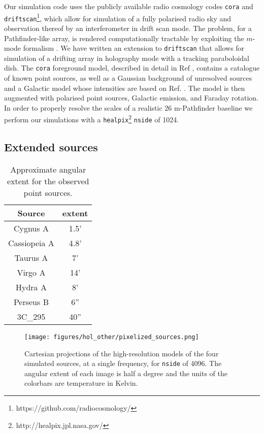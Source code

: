 Our simulation code uses the publicly available radio cosmology codes \texttt{cora} and \texttt{driftscan}\footnote{https://github.com/radiocosmology/}, which allow for simulation of a fully polarised radio sky and observation thereof by an interferometer in drift scan mode. The problem, for a Pathfinder-like array, is rendered computationally tractable by exploiting the $m$-mode formalism \citep{mmodes1, mmodes2}. We have written an extension to \texttt{driftscan} that allows for simulation of a drifting array in holography mode with a tracking paraboloidal dish. The \texttt{cora} foreground model, described in detail in Ref \citep{mmodes2}, contains a catalogue of known point sources, as well as a Gaussian background of unresolved sources and a Galactic model whose intensities are based on Ref. \citep{santoscoorayknox}. The model is then augmented with polarised point sources, Galactic emission, and Faraday rotation. In order to properly resolve the scales of a realistic 26 m-Pathfinder baseline we perform our simulations with a \texttt{healpix}\footnote{http://healpix.jpl.nasa.gov/} \citep{gorski} \texttt{nside} of 1024.


\subsection{Extended sources}

\begin{table}[ht]
\caption{Approximate angular extent for the observed point sources.} 
\label{tab2}
\begin{center}
\begin{tabular}{| c  | c |}
\hline
 Source  & extent  \\ \hline
Cygnus A & 1.5' \\ \hline
Cassiopeia A & 4.8' \\ \hline
Taurus A & 7' \\ \hline
Virgo A & 14' \\ \hline
Hydra A & 8' \\ \hline
Perseus B  & 6'' \\ \hline
3C\_295 & 40'' \\ \hline
\end{tabular}
\end{center}
\end{table}

\begin{figure}[h!]
\begin{center}
\texttt{[image: figures/hol\_other/pixelized\_sources.png]}
\caption{Cartesian projections of the high-resolution models of the four simulated sources, at a single frequency, for \texttt{nside} of 4096. The angular extent of each image is half a degree and the units of the colorbars are temperature in Kelvin.}
\label{pixelized_sources}
\end{center}
\end{figure} 

